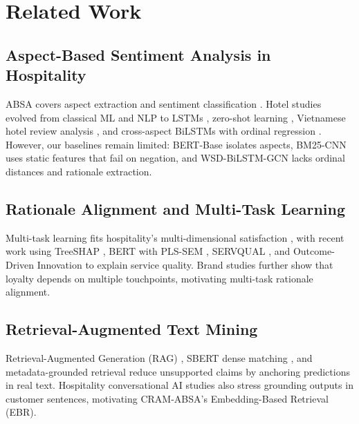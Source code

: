 \documentclass[pdflatex,sn-mathphys-num]{sn-jnl}%
\theoremstyle{thmstyleone}%
\theoremstyle{thmstyletwo}%
\theoremstyle{thmstylethree}%
\begin{document}
\section{Related Work}
\label{sec:related_work}

\subsection{Aspect-Based Sentiment Analysis in Hospitality}
\label{subsec:rw_absa_hospitality}
ABSA covers aspect extraction and sentiment classification \cite{ref18_brauwers2022}. Hotel studies evolved from classical ML and NLP \cite{ref07_apriliani2020,ref08_ounacer2023} to LSTMs \cite{ref29_jayanto2022}, zero-shot learning \cite{ref05_nawawi2024}, Vietnamese hotel review analysis \cite{ref10_nguyen2023,ref25_le2026}, and cross-aspect BiLSTMs with ordinal regression \cite{ref30_tran2026}. However, our baselines remain limited: BERT-Base \cite{ref01_bimaputra2023} isolates aspects, BM25-CNN \cite{ref04_namee2023} uses static features that fail on negation, and WSD-BiLSTM-GCN \cite{ref09_nadeem2025} lacks ordinal distances and rationale extraction.

\subsection{Rationale Alignment and Multi-Task Learning}
\label{subsec:rw_rationale_multitask}
Multi-task learning fits hospitality's multi-dimensional satisfaction \cite{ref06_yu2024,ref13_zhang2022,ref27_alghuribi2025}, with recent work using TreeSHAP \cite{ref16_shin2024}, BERT with PLS-SEM \cite{ref28_xia2026}, SERVQUAL \cite{ref17_perdomo2026}, and Outcome-Driven Innovation \cite{ref12_nam2021} to explain service quality. Brand studies \cite{ref19_tahir2024,ref26_piriyakul2024} further show that loyalty depends on multiple touchpoints, motivating multi-task rationale alignment.

\subsection{Retrieval-Augmented Text Mining}
\label{subsec:rw_retrieval_augmented}
Retrieval-Augmented Generation (RAG) \cite{ref23_lewis2020}, SBERT dense matching \cite{ref24_reimers2019}, and metadata-grounded retrieval \cite{ref02_bruni2025} reduce unsupported claims by anchoring predictions in real text. Hospitality conversational AI studies \cite{ref14_jeong2024,ref22_aransyah2026} also stress grounding outputs in customer sentences, motivating CRAM-ABSA's Embedding-Based Retrieval (EBR).
\end{document}
